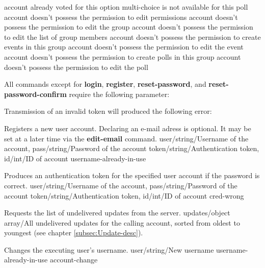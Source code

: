 \documentclass[parskip=full,11pt]{scrartcl}
\begin{document}
{account already voted for this option}
{multi-choice is not available for this poll}
{account doesn't possess the permission to edit permissions}
{account doesn't possess the permission to edit the group}
{account doesn't possess the permission to edit the list of group members}
{account doesn't possess the permission to create events in this group}
{account doesn't possess the permission to edit the event}
{account doesn't possess the permission to create polls in this group}
{account doesn't possess the permission to edit the poll}

All commands except for \textbf{login}, \textbf{register},
\textbf{reset-password}, and \textbf{reset-password-confirm} require the
following parameter:\\
\par Transmission of an invalid token will produced the following error:\\

{Registers a new user account.
Declaring an e-mail adress is optional.
It may be set at a later time via the \textbf{edit-email} command.}
{user/string/Username of the account,
pass/string/Password of the account}
{token/string/Authentication token,
id/int/ID of account}
{username-already-in-use}
{}

{Produces an authentication token for the specified user account if the
password is correct.}
{user/string/Username of the account,
pass/string/Password of the account}
{token/string/Authentication token,
id/int/ID of account}
{cred-wrong}
{}

{Requests the list of undelivered updates from the server.}
{}
{updates/object array/All undelivered updates for the calling account{,} sorted
from oldest to youngest (see chapter \ref{subsec:Update-desc}).}
{}
{}

{Changes the executing user's username.}
{user/string/New username}
{}
{username-already-in-use}
{account-change}
\end{document}
